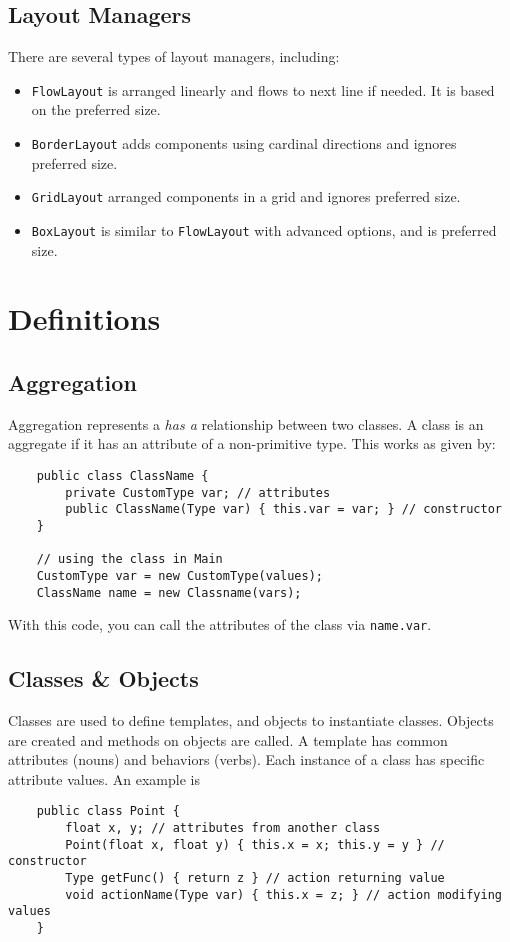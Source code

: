 \documentclass[letterpaper, openany, justified]{tufte-book}
\newcommand{\cd}[1]{\lstinline{#1}}
\begin{document}
\begin{fullwidth}
\section{Layout Managers}
There are several types of layout managers, including:
\begin{itemize}
    \item \cd{FlowLayout} is arranged linearly and flows to next line if needed. It is based on the preferred size.
    \item \cd{BorderLayout} adds components using cardinal directions and ignores preferred size.
    \item \cd{GridLayout} arranged components in a grid and ignores preferred size.
    \item \cd{BoxLayout} is similar to \cd{FlowLayout} with advanced options, and is preferred size.
\end{itemize}

\chapter{Definitions}

\section{Aggregation}
Aggregation represents a \textit{has a} relationship between two classes. A class is an aggregate if it has an attribute of a non-primitive type. This works as given by:
\begin{lstlisting}
    public class ClassName {
        private CustomType var; // attributes
        public ClassName(Type var) { this.var = var; } // constructor
    }

    // using the class in Main
    CustomType var = new CustomType(values);
    ClassName name = new Classname(vars);
\end{lstlisting}
With this code, you can call the attributes of the class via \cd{name.var}.
\section{Classes \& Objects}
Classes are used to define templates, and objects to instantiate classes. Objects are created and methods on objects are called. A template has common attributes (nouns) and behaviors (verbs). Each instance of a class has specific attribute values. An example is
\begin{lstlisting}
    public class Point {
        float x, y; // attributes from another class
        Point(float x, float y) { this.x = x; this.y = y } // constructor
        Type getFunc() { return z } // action returning value
        void actionName(Type var) { this.x = z; } // action modifying values
    }
\end{lstlisting}


\end{fullwidth}
\end{document}
